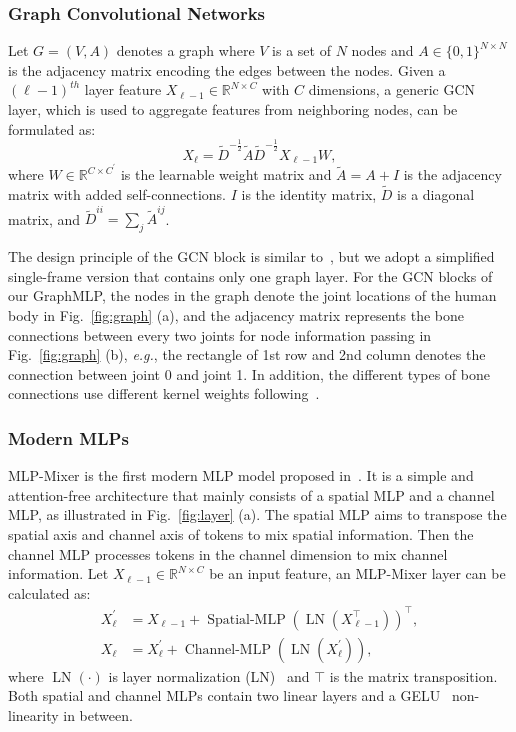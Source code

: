 \documentclass[lettersize,journal]{IEEEtran}
\begin{document}
\subsubsection{Graph Convolutional Networks}
Let $G=(V, A)$ denotes a graph where $V$ is a set of $N$ nodes and $A \in \{0, 1\}^{N \times N}$ is the adjacency matrix encoding the edges between the nodes. 
Given a $(\ell-1)^{th}$ layer feature $X_{\ell-1} \in \mathbb{R}^{N \times C}$ with $C$ dimensions, a generic GCN~\cite{kipf2016semi} layer, which is used to aggregate features from neighboring nodes, can be formulated as:
\begin{equation}
  X_{\ell}=\widetilde{D}^{-\frac{1}{2}}  \widetilde{A} \widetilde{D}^{-\frac{1}{2}} X_{\ell-1} W,
\end{equation}
where $W \in \mathbb{R}^{C \times C^{\prime}}$ is the learnable weight matrix and $\widetilde{A} = A+I$ is the adjacency matrix with added self-connections. 
$I$ is the identity matrix, $\widetilde{D}$ is a diagonal matrix, and $\widetilde{D}^{i i}=\sum_{j} \tilde{A}^{i j}$. 

The design principle of the GCN block is similar to~\cite{stgcn}, but we adopt a simplified single-frame version that contains only one graph layer. 
For the GCN blocks of our GraphMLP, the nodes in the graph denote the joint locations of the human body in Fig.~\ref{fig:graph} (a), and the adjacency matrix represents the bone connections between every two joints for node information passing in Fig.~\ref{fig:graph} (b), \emph{e.g.}, the rectangle of 1st row and 2nd column denotes the connection between joint 0 and joint 1. 
In addition, the different types of bone connections use different kernel weights following~\cite{stgcn}. 

\subsubsection{Modern MLPs}
MLP-Mixer is the first modern MLP model proposed in~\cite{mlpmixer}. 
It is a simple and attention-free architecture that mainly consists of a spatial MLP and a channel MLP, as illustrated in Fig.~\ref{fig:layer} (a). 
The spatial MLP aims to transpose the spatial axis and channel axis of tokens to mix spatial information. Then the channel MLP processes tokens in the channel dimension to mix channel information. 
Let $X_{\ell-1} \in \mathbb{R}^{N \times C}$ be an input feature, an MLP-Mixer layer can be calculated as:
\begin{align}
  X^{\prime}_{\ell} &= X_{\ell-1} + \operatorname{Spatial-MLP}(\operatorname{LN}(X_{\ell-1}^{\top}))^{\top}, 
  \label{equ:mlpmixer_spatial} \\
  X_{\ell} &= X^{\prime}_{\ell} + \operatorname{Channel-MLP}(\operatorname{LN}(X^{\prime}_{\ell})),
  \label{equ:mlpmixer_channel}
\end{align}
where $\operatorname{LN}(\cdot)$ is layer normalization (LN)~\cite{ba2016layer} and $\top$ is the matrix transposition. 
Both spatial and channel MLPs contain two linear layers and a GELU~\cite{hendrycks2016gaussian} non-linearity in between. 
\end{document}
